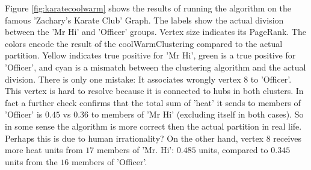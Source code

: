 Figure \ref{fig:karatecoolwarm} shows the results of running the
algorithm on the 
famous 'Zachary's Karate Club' Graph. The labels show the actual division
between the 'Mr Hi' and 'Officer' groups.
Vertex size indicates its PageRank.
The colors encode the result of the coolWarmClustering compared to the actual
partition. Yellow indicates true positive for 'Mr Hi', green is a
true positive for 'Officer', and cyan is a mismatch between
the clustering algorithm and the actual division.
There is only one mistake:
It associates wrongly vertex 8 to 'Officer'.  This vertex
is hard to resolve because it is connected to hubs in both clusters.
In fact a further check confirms that the total sum of 'heat' it sends to members of
'Officer' is $0.45$ vs $0.36$ to members of 'Mr Hi' (excluding itself in both
cases). So in some sense the algorithm is more correct then the actual
partition in real life. Perhaps this is due to human irrationality?
On the other hand, vertex $8$ receives more heat units from $17$ members of 'Mr. Hi': $0.485$
units, compared to $0.345$ units from the $16$ members of 'Officer'. 


